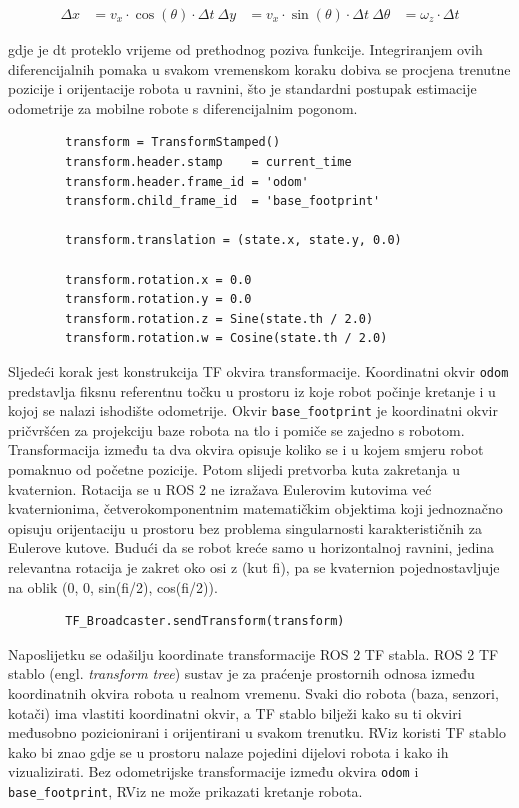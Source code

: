 \documentclass[12pt,a4paper,oneside]{report}
\begin{document}
\begin{align}
\Delta x &= v_x \cdot \cos(\theta) \cdot \Delta t \
\Delta y &= v_x \cdot \sin(\theta) \cdot \Delta t \
\Delta \theta &= \omega_z \cdot \Delta t
\end{align}

gdje je dt proteklo vrijeme od prethodnog poziva funkcije. Integriranjem ovih diferencijalnih pomaka u 
svakom vremenskom koraku dobiva se procjena trenutne pozicije i orijentacije robota u ravnini, što je 
standardni postupak estimacije odometrije za mobilne robote s diferencijalnim pogonom.

\begin{verbatim}
        transform = TransformStamped()
        transform.header.stamp    = current_time
        transform.header.frame_id = 'odom'
        transform.child_frame_id  = 'base_footprint'

        transform.translation = (state.x, state.y, 0.0)

        transform.rotation.x = 0.0
        transform.rotation.y = 0.0
        transform.rotation.z = Sine(state.th / 2.0)
        transform.rotation.w = Cosine(state.th / 2.0)
\end{verbatim}

Sljedeći korak jest konstrukcija TF okvira transformacije. 
Koordinatni okvir \texttt{odom} predstavlja fiksnu referentnu točku u prostoru iz koje robot počinje 
kretanje i u kojoj se nalazi ishodište odometrije. Okvir \texttt{base\_footprint} je koordinatni okvir 
pričvršćen za projekciju baze robota na tlo i pomiče se zajedno s robotom. Transformacija između ta dva 
okvira opisuje koliko se i u kojem smjeru robot pomaknuo od početne pozicije.
Potom slijedi pretvorba kuta zakretanja u kvaternion. Rotacija se u ROS 2 ne 
izražava Eulerovim kutovima već kvaternionima, četverokomponentnim matematičkim objektima koji jednoznačno 
opisuju orijentaciju u prostoru bez problema singularnosti karakterističnih za Eulerove kutove. Budući da 
se robot kreće samo u horizontalnoj ravnini, jedina relevantna rotacija je zakret oko osi z (kut fi), pa se 
kvaternion pojednostavljuje na oblik (0, 0, sin(fi/2), cos(fi/2)).

\begin{verbatim}
        TF_Broadcaster.sendTransform(transform)
\end{verbatim}

Naposlijetku se odašilju koordinate transformacije ROS 2 TF stabla. ROS 2 TF stablo 
(engl. \textit{transform tree}) sustav je za praćenje prostornih odnosa između koordinatnih okvira robota 
u realnom vremenu. Svaki dio robota (baza, senzori, kotači) ima vlastiti koordinatni okvir, a TF stablo 
bilježi kako su ti okviri međusobno pozicionirani i orijentirani u svakom trenutku. RViz koristi TF stablo 
kako bi znao gdje se u prostoru nalaze pojedini dijelovi robota i kako ih vizualizirati. 
Bez odometrijske transformacije između okvira \texttt{odom} i \texttt{base\_footprint}, RViz ne može 
prikazati kretanje robota.
\end{document}
